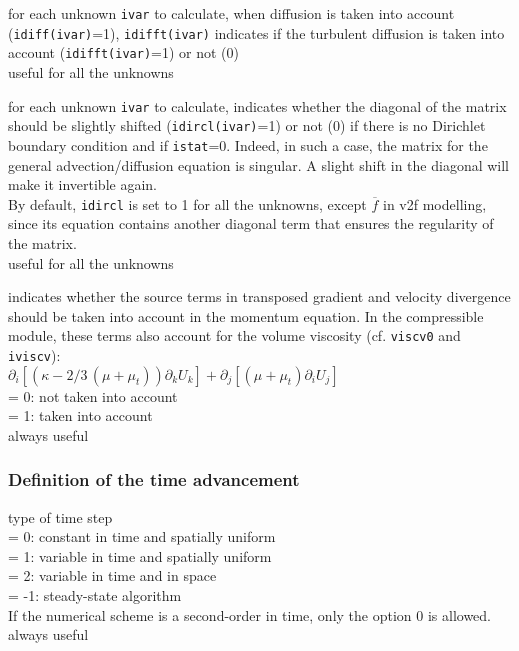 {for each unknown {\tt ivar} to calculate, when diffusion is taken
into account ({\tt idiff(ivar)}=1), {\tt idifft(ivar)} indicates if the turbulent
diffusion is taken into account ({\tt idifft(ivar)}=1) or not (0)\\
useful for all the unknowns }

{for each unknown {\tt ivar} to calculate, indicates whether the diagonal
of the matrix should be slightly shifted ({\tt idircl(ivar)}=1) or not (0) if there
is no Dirichlet boundary condition and if {\tt istat}=0. Indeed, in such a case,
the matrix for the general advection/diffusion equation is singular. A slight
shift in the diagonal will make it invertible again.\\
By default, {\tt idircl} is set to 1 for all the unknowns, except $\overline{f}$ in
v2f modelling, since its equation contains another diagonal term that ensures
the regularity of the matrix.\\
useful for all the unknowns}

{indicates whether the source terms in transposed gradient
and velocity divergence should be taken into account in the momentum
equation. In the compressible module, these terms also account for the volume
viscosity (cf. {\tt viscv0} and {\tt iviscv}):\\
$\partial_i \left[(\kappa -2/3\,(\mu+\mu_t))\partial_k U_k  \right]
 +     \partial_j \left[ (\mu+\mu_t)\partial_i U_j \right]$ \\
\hspace*{1.3cm}= 0: not taken into account\\
\hspace*{1.3cm}= 1: taken into account\\
always useful}


\subsubsection{Definition of the time advancement}

{type of time step\\
\hspace*{1.3cm}= 0: constant in time and spatially uniform\\
\hspace*{1.3cm}= 1: variable in time and spatially uniform\\
\hspace*{1.3cm}= 2: variable in time and in space\\
\hspace*{1.3cm}= -1: steady-state algorithm\\
If the numerical scheme is a second-order in time, only the option 0 is
allowed.\\
always useful}


